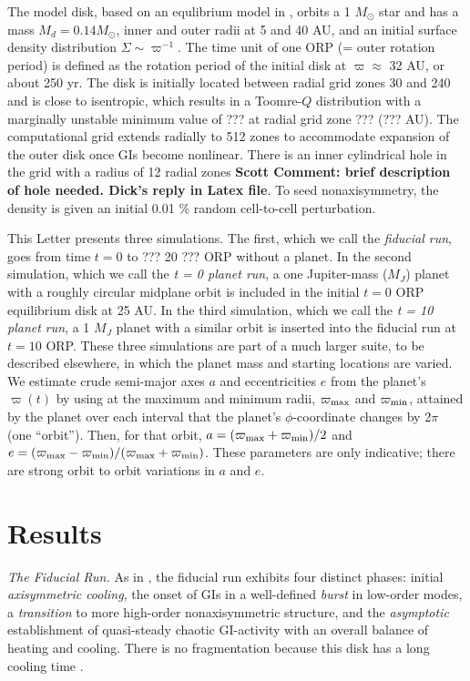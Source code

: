 \documentclass[12pt,manuscript,authoryear]{aastex}
\begin{document}
The model disk, based on an equlibrium model in \citet{pickett2003}, orbits a 1 $M_{\odot}$ star and has a mass $M_d = 0.14 M_{\odot}$, inner and outer radii at 5 and 40 AU, and an initial surface density distribution $\Sigma \sim \varpi^{-1}$. The time unit of one ORP (= outer rotation period) is defined as the rotation period of the initial disk at $\varpi \approx$ 32 AU, or about 250 yr. The disk is initially located between radial grid zones 30 and 240 and is close to isentropic, which results in a Toomre-$Q$ distribution with a marginally unstable \citep[see ][]{durisen2007} minimum value of ??? at radial grid zone ??? (??? AU). The computational grid extends radially to 512 zones to accommodate expansion of the outer disk once GIs become nonlinear. There is an inner cylindrical hole in the grid with a radius of 12 radial zones {\bf Scott Comment: brief description of hole needed. Dick's reply in Latex file}. 
To seed nonaxisymmetry, the density is given an initial 0.01 \% random cell-to-cell perturbation.

This Letter presents three simulations. The first, which we call the {\sl fiducial run}, goes from time $t = 0$ to ??? 20 ??? ORP without a planet. In the second simulation, which we call the {\sl t = 0 planet run}, a one Jupiter-mass ($M_J$) planet with a roughly circular midplane orbit is included in the initial $t = 0$ ORP equilibrium disk at 25 AU. In the third simulation, which we call the {\sl t = 10 planet run}, a 1 $M_J$ planet with a similar orbit is inserted into the fiducial run at $t = 10$ ORP. These three simulations are part of a much larger suite, to be described elsewhere, in which the planet mass and starting locations are varied. We estimate crude semi-major axes $a$ and eccentricities $e$ from the planet's $\varpi(t)$ by using at the maximum and minimum radii, $\varpi_{\rm max}$ and $\varpi_{\rm min}$, attained by the planet over each interval that the planet's $\phi$-coordinate changes by 2$\pi$ (one ``orbit'').  Then, for that orbit, $a = (\varpi_{\rm max}+\varpi_{\rm min})/2$ and $e = (\varpi_{\rm max}-\varpi_{\rm min})/(\varpi_{\rm max}+\varpi_{\rm min})$. These parameters are only indicative; there are strong orbit to orbit variations in $a$ and $e$.

\section{Results}

{\it The Fiducial Run.} As in \citet{mejia2005}, the fiducial run exhibits four distinct phases: initial {\sl axisymmetric cooling}, the onset of GIs in a well-defined {\sl burst} in low-order modes, a {\sl transition} to more high-order nonaxisymmetric structure, and the {\sl asymptotic} establishment of quasi-steady chaotic GI-activity with an overall balance of heating and cooling. There is no fragmentation because this disk has a long cooling time \citep{gammie2001,boley2006,boley2007b}.
\end{document}

